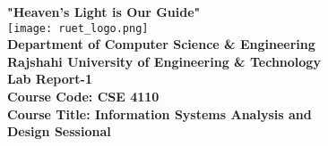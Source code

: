 \documentclass[12pt,a4paper]{article}
\begin{document}

\begin{titlepage}
    \thispagestyle{empty}
    \centering
    \vspace*{0.5cm}
    
    {\large \textbf{"Heaven's Light is Our Guide"}}\\[0.3cm]
    
    \texttt{[image: ruet\_logo.png]} \\[0.4cm]
    

    {\Large \textbf{Department of Computer Science \& Engineering}}\\[0.3cm]
    {\large \textbf{Rajshahi University of Engineering \& Technology}}\\[0.8cm]

    \vspace{0.8cm}
    {\LARGE \textbf{Lab Report-1}}\\[0.2cm]

    \vspace{0.8cm}
    {\Large \textbf{Course Code: CSE 4110}}\\[0.2cm]
    \vspace{0.3cm}
    {\Large \textbf{Course Title: Information Systems Analysis and}}\\
    \vspace{0.3cm}
    {\Large \hspace{-1.0cm}\textbf{Design Sessional}}\\[0.8cm]
    

\end{titlepage}
\end{document}
